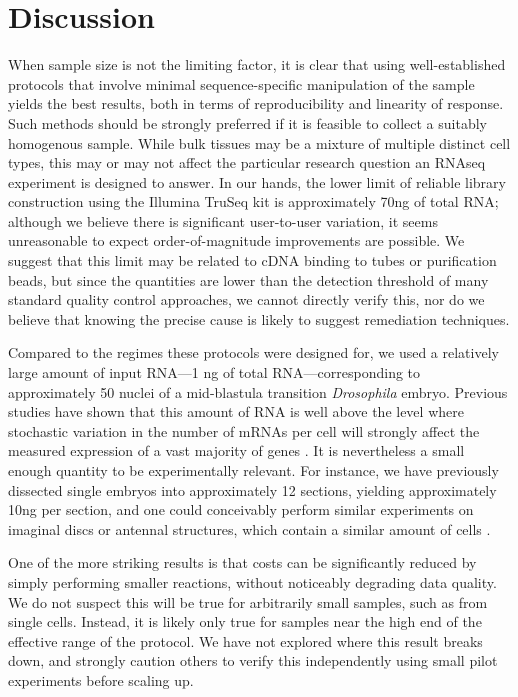 \section{Discussion}


When sample size is not the limiting factor, it is clear that using well-established protocols that involve minimal sequence-specific manipulation of the sample yields the best results, both in terms of reproducibility and linearity of response. Such methods should be strongly preferred if it is feasible to collect a suitably homogenous sample. While bulk tissues may be a mixture of multiple distinct cell types, this may or may not affect the particular research question an RNAseq experiment is designed to answer.  In our hands, the lower limit of reliable library construction using the Illumina TruSeq kit is approximately 70ng of total RNA; although we believe there is significant user-to-user variation, it seems unreasonable to expect order-of-magnitude improvements are possible. We suggest that this limit may be related to cDNA binding to tubes or purification beads, but since the quantities are lower than the detection threshold of many standard quality control approaches, we cannot directly verify this, nor do we believe that knowing the precise cause is likely to suggest remediation techniques.


Compared to the regimes these protocols were designed for, we used a relatively large amount of input RNA---1 ng of total RNA---corresponding to approximately 50 nuclei of a mid-blastula transition {\em Drosophila} embryo. Previous studies have shown that this amount of RNA is well above the level where stochastic variation in the number of mRNAs per cell will strongly affect the measured expression of a vast majority of genes \cite{Marinov:2013fm}. It is nevertheless a small enough quantity to be experimentally relevant.  For instance, we have previously dissected single embryos into approximately 12 sections, yielding approximately 10ng per section\cite{Combs:2013jy}, and one could conceivably perform similar experiments on imaginal discs or antennal structures, which contain a similar amount of cells \cite{Klebes:2002ua,Hansson:2000cx}.

One of the more striking results is that costs can be significantly reduced by simply performing smaller reactions, without noticeably degrading data quality.  We do not suspect this will be true for arbitrarily small samples, such as from single cells.  Instead, it is likely only true for samples near the high end of the effective range of the protocol. We have not explored where this result breaks down, and strongly caution others to verify this independently using small pilot experiments before scaling up.
